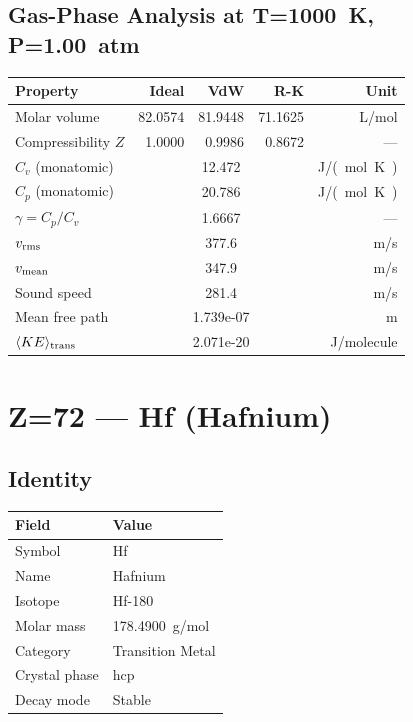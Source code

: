 \documentclass[11pt,a4paper]{article}
\begin{document}
\subsection{Gas-Phase Analysis at T=\SI{1000}{K}, P=\SI{1.00}{atm}}
\begin{tabular}{lrrrr}
  \toprule
  Property & Ideal & VdW & R-K & Unit \\
  \midrule
  Molar volume & 82.0574 & 81.9448 & 71.1625 & \si{L/mol} \\
  Compressibility $Z$ & 1.0000 & 0.9986 & 0.8672 & --- \\
  \midrule
  $C_v$ (monatomic) & \multicolumn{3}{c}{12.472} & \si{J/(mol.K)} \\
  $C_p$ (monatomic) & \multicolumn{3}{c}{20.786} & \si{J/(mol.K)} \\
  $\gamma = C_p/C_v$ & \multicolumn{3}{c}{1.6667} & --- \\
  $v_{\rm rms}$ & \multicolumn{3}{c}{377.6} & \si{m/s} \\
  $v_{\rm mean}$ & \multicolumn{3}{c}{347.9} & \si{m/s} \\
  Sound speed & \multicolumn{3}{c}{281.4} & \si{m/s} \\
  Mean free path & \multicolumn{3}{c}{1.739e-07} & \si{m} \\
  $\langle KE \rangle_{\rm trans}$ & \multicolumn{3}{c}{2.071e-20} & \si{J/molecule} \\
  \bottomrule
\end{tabular}

\newpage

\section{Z=72 --- Hf (Hafnium)}
\label{sec:Z72}

\subsection{Identity}
\begin{tabular}{ll}
  \toprule
  Field & Value \\
  \midrule
  Symbol & Hf \\
  Name & Hafnium \\
  Isotope & Hf-180 \\
  Molar mass & \SI{178.4900}{g/mol} \\
  Category & Transition Metal \\
  Crystal phase & hcp \\
  Decay mode & Stable \\
  \bottomrule
\end{tabular}
\end{document}
